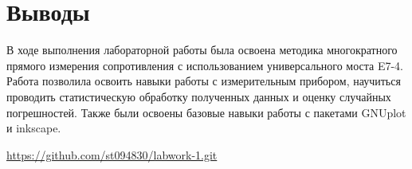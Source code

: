  \newpage


\section{Выводы}
В ходе выполнения лабораторной работы была освоена методика многократного прямого измерения сопротивления с использованием универсального моста E7-4. Работа позволила освоить навыки работы с измерительным прибором, научиться проводить статистическую обработку полученных данных и оценку случайных погрешностей.
Также были освоены базовые навыки работы с пакетами GNUplot и inkscape.

\begin{thebibliography}{9}

\url{https://github.com/st094830/labwork-1.git}  

\end{thebibliography}